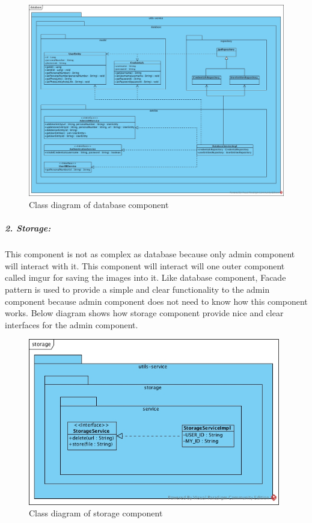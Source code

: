 \documentclass[a4paper,11pt]{article}
\begin{document}
\begin{figure}[ht!]
    \centering
	\includegraphics[width=130mm]{ClassDiagrams/new/database.jpg}
	\caption{Class diagram of database component}
\end{figure}

\newpage
\subparagraph{2. Storage: }This component is not as complex as database because only admin component will interact with it. This component will interact will one outer component called imgur for saving the images into it. Like database component, Facade pattern is used to provide a simple and clear functionality to the admin component because admin component does not need to know how this component works. Below diagram shows how storage component provide nice and clear interfaces for the admin component.

\begin{figure}[ht!]
    \centering
	\includegraphics[width=110mm]{ClassDiagrams/new/storage.jpg}
	\caption{Class diagram of storage component}
\end{figure}
\end{document}
